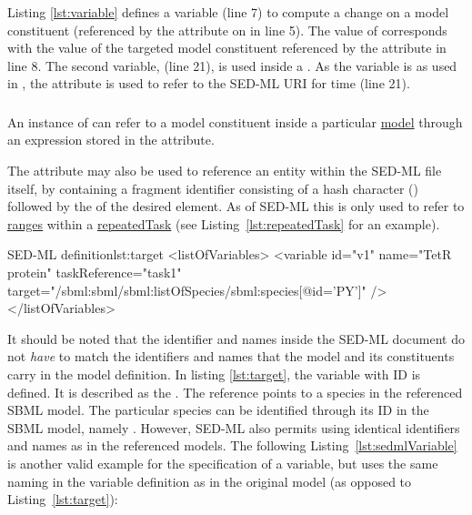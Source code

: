 Listing \ref{lst:variable} defines a variable  (line 7) to compute a change on a model constituent (referenced by the  attribute on  in line 5). The value of  corresponds with the value of the targeted model constituent referenced by the  attribute in line 8. 
The second variable,  (line 21), is used inside a . As the variable is  as used in , the  attribute is used to refer to the SED-ML URI for time (line 21).


\subsubsection{}
\label{sec:target}
An instance of  can refer to a model constituent inside a particular \hyperref[class:model]{model} through an  expression stored in the  attribute. 

The  attribute may also be used to reference an entity within the SED-ML file itself, by containing a fragment identifier consisting of a hash character (\code{\#}) followed by the  of the desired element. As of SED-ML \currentLV this is only used to refer to \hyperref[sec:ranges]{ranges} within a \hyperref[class:repeatedTask]{repeatedTask} (see Listing~\ref{lst:repeatedTask} for an example).


\begin{myXmlLst}{SED-ML  definition}{lst:target}
<listOfVariables>
	<variable id="v1" name="TetR protein" taskReference="task1" 
		target="/sbml:sbml/sbml:listOfSpecies/sbml:species[@id='PY']" />
</listOfVariables>
\end{myXmlLst}

It should be noted that the identifier and names inside the SED-ML document do not \emph{have} to match the identifiers and names that the model and its constituents carry in the model definition.
In listing \vref{lst:target}, the variable with ID  is defined. It is described as the . The reference points to a species in the referenced SBML model. The particular species can be identified through its ID in the SBML model, namely .
However, SED-ML also permits using identical identifiers and names as in the referenced models. The following Listing~\vref{lst:sedmlVariable} is another valid example for the specification of a variable, but uses the same naming in the variable definition as in the original model (as opposed to Listing~\ref{lst:target}):

